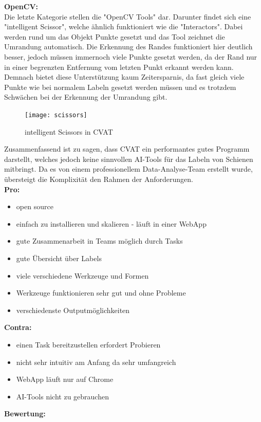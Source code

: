 \documentclass[11pt]{scrartcl}
\begin{document}
\noindent
\textbf{OpenCV: } 
\\

\noindent
Die letzte Kategorie stellen die "OpenCV Tools" dar. Darunter findet sich eine "intelligent Scissor", welche ähnlich funktioniert wie die "Interactors". Dabei werden rund um das Objekt Punkte gesetzt und das Tool zeichnet die Umrandung automatisch. Die Erkennung des Randes funktioniert hier deutlich besser, jedoch müssen immernoch viele Punkte gesetzt werden, da der Rand nur in einer begrenzten Entfernung vom letzten Punkt erkannt werden kann. Demnach bietet diese Unterstützung kaum Zeitersparnis, da fast gleich viele Punkte wie bei normalem Labeln gesetzt werden müssen und es trotzdem Schwächen bei der Erkennung der Umrandung gibt.
\begin{figure}[H]
  \texttt{[image: scissors]}
  \caption{intelligent Scissors in CVAT}
\end{figure}
\noindent
Zusammenfassend ist zu sagen, dass CVAT ein performantes gutes Programm darstellt, welches jedoch keine sinnvollen AI-Tools für das Labeln von Schienen mitbringt. Da es von einem professionellem Data-Analyse-Team erstellt wurde, übersteigt die Komplixität den Rahmen der Anforderungen.
\\

\textbf{Pro:} 
\begin{itemize}
	\item open source
	\item einfach zu installieren und skalieren - läuft in einer WebApp
	\item gute Zusammenarbeit in Teams möglich durch Tasks
	\item gute Übersicht über Labels
	\item viele verschiedene Werkzeuge und Formen 
	\item Werkzeuge funktionieren sehr gut und ohne Probleme 
	\item verschiedenste Outputmöglichkeiten 
\end{itemize}
\textbf{Contra:} 
\begin{itemize}
	\item einen Task bereitzustellen erfordert Probieren
	\item nicht sehr intuitiv am Anfang da sehr umfangreich
	\item WebApp läuft nur auf Chrome
	\item AI-Tools nicht zu gebrauchen
\end{itemize}


\noindent
\textbf{Bewertung:}
\\
\end{document}
